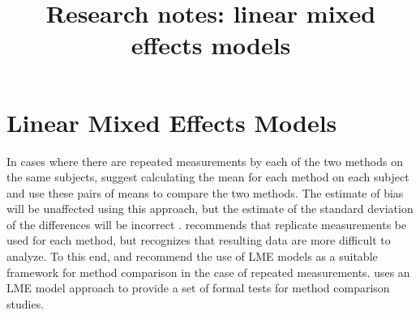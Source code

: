\documentclass[12pt, a4paper]{report}
\title{Research notes: linear mixed effects models}
\author{ } \date{ }
\theoremstyle{plain}
\theoremstyle{definition}
\theoremstyle{remark}
\begin{document}
	\tableofcontents

	
%	
%	

			\chapter{Linear Mixed Effects Models}


In cases where there are repeated measurements by each of the two methods on the same subjects, \citet{BA99} suggest calculating
the mean for each method on each subject and use these pairs of means to compare the two methods. The estimate of bias will be unaffected using this approach, but the estimate of the standard deviation of the differences will be incorrect \citep{BXC2004}. \citet{BXC2004} recommends that replicate measurements be used for each method, but recognizes that resulting data are more difficult to analyze. To this end, \citet{BXC2004} and \citet{BXC2008} recommend the use of LME models as a suitable framework for method comparison in the case of repeated measurements.
\citet{ARoy2009} uses an LME model approach to provide a set of formal tests for method comparison studies.
\end{document}

